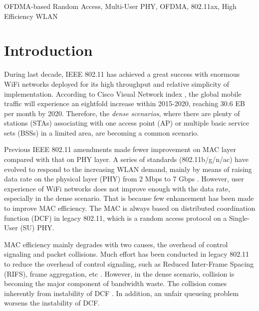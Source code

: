 \documentclass[journal]{IEEEtran}
\begin{document}
\begin{IEEEkeywords}
OFDMA-based Random Access, Multi-User PHY, OFDMA, 802.11ax, High Efficiency WLAN
\end{IEEEkeywords}






%
\IEEEpeerreviewmaketitle
\section{Introduction}		\label{Intro}
During last decade, IEEE 802.11 has achieved a great success with enormous WiFi networks deployed for its high throughput and relative simplicity of implementation.
According to Cisco Visual Network index \cite{cisco2016}, the global mobile traffic will experience an eightfold increase within 2015-2020, reaching 30.6 EB per month by 2020.
Therefore, the \textit{dense scenarios}, where there are plenty of stations (STAs) associating with one access point (AP) or multiple basic service sets (BSSs) in a limited area, are becoming a common scenario. 

Previous IEEE 802.11 amendments made fewer improvement on MAC layer compared with that on PHY layer. 
A series of standards (802.11b/g/n/ac) have evolved to respond to the increasing WLAN demand, mainly by means of raising data rate on the physical layer (PHY)  from 2 Mbps to 7 Gbps \cite{perahia2013next}.
However, user experience of WiFi networks does not improve enough with the data rate, especially in the dense scenario. 
That is because few enhancement has been made to improve MAC efficiency.
The MAC is always based on distributed coordination function (DCF) in legacy 802.11, which is a random access protocol on a Single-User (SU) PHY. 

MAC efficiency mainly degrades with two causes, the overhead of control signaling and packet collisions.
Much effort has been conducted in legacy 802.11 to reduce the overhead of control signaling, such as Reduced Inter-Frame Spacing (RIFS), frame aggregation, etc \cite{perahia2013next}. 
However, in the dense scenario, collision is becoming the major component of bandwidth waste.
The collision comes inherently from instability of DCF \cite{bertsekas1992data}.
In addition, an unfair queueing problem worsens the instability of DCF.
\end{document}
